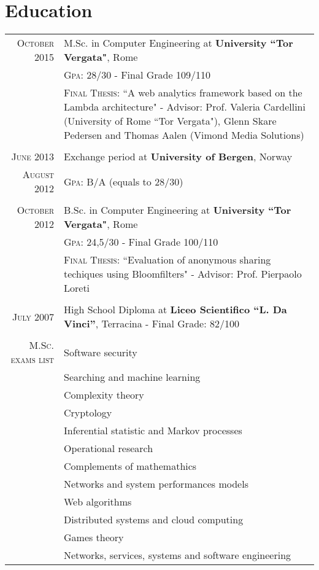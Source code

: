 \documentclass[a4paper,10pt]{article} %
\begin{document}
\section{Education}

\begin{tabular}{r|p{11cm}}	

\textsc{October} 2015 & M.Sc. in Computer Engineering at \textbf{University ``Tor Vergata"}, Rome\\
& \textsc{Gpa}: 28/30 - Final Grade 109/110\\
& \textsc{Final Thesis}: ``A web analytics framework based on the Lambda architecture" - Advisor: Prof. Valeria Cardellini (University of Rome ``Tor Vergata"), Glenn Skare Pedersen and Thomas Aalen (Vimond Media Solutions)\\
\multicolumn{2}{c}{} \\



\textsc{June} 2013 & Exchange period at \textbf{University of Bergen}, Norway
\\ \textsc{August} 2012 &\textsc{Gpa}: B/A (equals to 28/30)
\\ 
\multicolumn{2}{c}{} \\


\textsc{October} 2012 & B.Sc. in Computer Engineering at \textbf{University ``Tor Vergata"}, Rome\\
& \textsc{Gpa}: 24,5/30 - Final Grade 100/110\\
& \textsc{Final Thesis}: ``Evaluation of anonymous sharing techiques using Bloomfilters" - Advisor: Prof. Pierpaolo Loreti\\
\multicolumn{2}{c}{} \\


\textsc{July} 2007& High School Diploma at \textbf{Liceo Scientifico ``L. Da Vinci''}, Terracina - Final Grade: 82/100 \\
\multicolumn{2}{c}{} \\


\textsc{M.Sc. exams list} &

Software security\\
& Searching and machine learning\\
& Complexity theory\\
& Cryptology\\
& Inferential statistic and Markov processes \\
& Operational research \\
& Complements of mathemathics \\
& Networks and system performances models \\
& Web algorithms \\
& Distributed systems and cloud computing\\
& Games theory\\
& Networks, services, systems and software engineering\\

\end{tabular}
\end{document}
